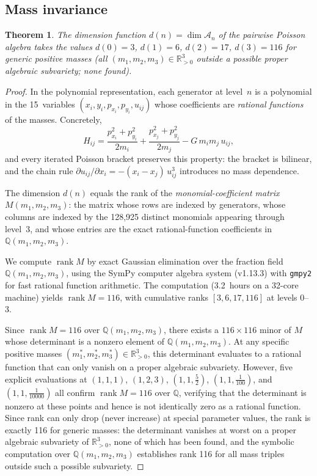 \documentclass[11pt,a4paper]{article}
\newtheorem{theorem}{Theorem}
\theoremstyle{remark}
\newcommand{\R}{\mathbb{R}}
\newcommand{\Q}{\mathbb{Q}}
\newcommand{\cA}{\mathcal{A}}
\DeclareMathOperator{\rank}{rank}
\begin{document}
\subsection{Mass invariance}

\begin{theorem}\label{thm:mass-inv}
The dimension function $d(n) = \dim \cA_n$ of the pairwise Poisson
algebra takes the values $d(0)=3$, $d(1)=6$, $d(2)=17$, $d(3)=116$
for generic positive masses (all $(m_1, m_2, m_3) \in \R_{>0}^3$
outside a possible proper algebraic subvariety; none found).
\end{theorem}

\begin{proof}
In the polynomial representation, each generator at level~$n$ is a
polynomial in the 15~variables $(x_i, y_i, p_{x_i}, p_{y_i}, u_{ij})$
whose coefficients are \emph{rational functions} of the masses.
Concretely,
\[
  H_{ij} = \frac{p_{x_i}^2 + p_{y_i}^2}{2m_i}
         + \frac{p_{x_j}^2 + p_{y_j}^2}{2m_j}
         - G\,m_i m_j\, u_{ij},
\]
and every iterated Poisson bracket preserves this property: the
bracket is bilinear, and the chain rule
$\partial u_{ij}/\partial x_i = -(x_i - x_j)\,u_{ij}^3$
introduces no mass dependence.

The dimension $d(n)$ equals the rank of the
\emph{monomial-coefficient matrix} $M(m_1,m_2,m_3)$: the matrix
whose rows are indexed by generators, whose columns are indexed by
the 128{,}925 distinct monomials appearing through level~3, and whose
entries are the exact rational-function coefficients in
$\Q(m_1,m_2,m_3)$.

We compute $\rank M$ by exact Gaussian elimination over the fraction
field $\Q(m_1,m_2,m_3)$, using the SymPy computer algebra system
(v1.13.3) with \texttt{gmpy2} for fast rational function arithmetic.
The computation (3.2~hours on a 32-core machine) yields
$\rank M = 116$, with cumulative ranks $[3,6,17,116]$ at levels
0--3.

Since $\rank M = 116$ over $\Q(m_1,m_2,m_3)$, there exists a
$116 \times 116$ minor of $M$ whose determinant is a nonzero element
of $\Q(m_1,m_2,m_3)$.  At any specific positive masses
$(m_1^*,m_2^*,m_3^*) \in \R_{>0}^3$, this determinant evaluates to a
rational function that can only vanish on a proper algebraic
subvariety.  However, five explicit evaluations at
$(1,1,1)$, $(1,2,3)$, $(1,1,\tfrac{5}{2})$,
$(1,1,\tfrac{1}{100})$, and $(1,1,\tfrac{1}{10000})$ all confirm
$\rank M = 116$ over $\Q$, verifying that the determinant is nonzero
at these points and hence is not identically zero as a rational
function.  Since rank can only drop (never increase) at special
parameter values, the rank is exactly 116 for generic masses:
the determinant vanishes at worst on a proper algebraic
subvariety of $\R_{>0}^3$, none of which has been found, and
the symbolic computation over $\Q(m_1,m_2,m_3)$ establishes
rank 116 for all mass triples outside such a possible
subvariety.


\end{proof}
\end{document}
